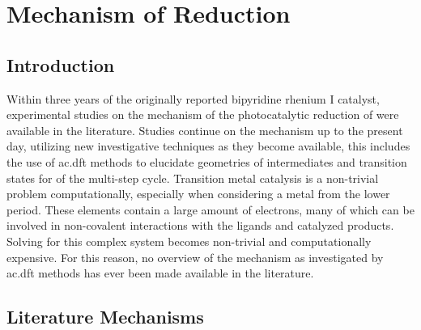 \chapter{Mechanism of \texorpdfstring{}{CO2} Reduction}\label{chap.mech}

\section{Introduction}

Within three years of the originally reported bipyridine rhenium I catalyst, experimental studies on the mechanism of the photocatalytic reduction of  were available in the literature\autocite{hawecker1986}. Studies continue on the mechanism up to the present day\autocite{koike2002, machan2014}, utilizing new investigative techniques as they become available, this includes the use of \gls{ac.dft} methods to elucidate geometries of intermediates and transition states for of the multi-step cycle. Transition metal catalysis is a non-trivial problem computationally, especially when considering a metal from the lower period. These elements contain a large amount of electrons, many of which can be involved in non-covalent interactions with the ligands and catalyzed products. Solving for this complex system becomes non-trivial and computationally expensive. For this reason, no overview of the mechanism as investigated by \gls{ac.dft} methods has ever been made available in the literature. 

\section{Literature Mechanisms}

